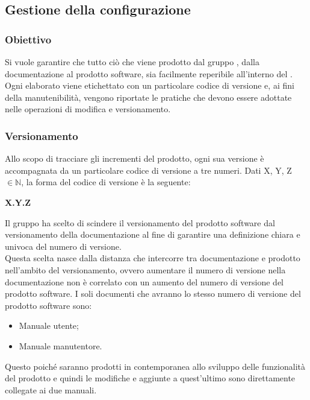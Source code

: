\subsection{Gestione della configurazione}
\subsubsection{Obiettivo}
Si vuole garantire che tutto ciò che viene prodotto dal gruppo \Gruppo{}, dalla documentazione al prodotto software, sia facilmente reperibile all’interno del .
Ogni elaborato viene etichettato con un particolare codice di versione e, ai fini della manutenibilità, vengono riportate le pratiche che devono essere adottate nelle operazioni di modifica e versionamento.

\subsubsection{Versionamento}
Allo scopo di tracciare gli incrementi del prodotto, ogni sua versione è accompagnata da un particolare codice di versione a tre numeri. Dati X, Y, Z $\in \mathbb{N}$, la forma del codice di versione è la seguente:
\begin{center}
	\textbf{X.Y.Z}
\end{center}
Il gruppo ha scelto di scindere il versionamento del prodotto software dal versionamento della documentazione al fine di garantire una definizione chiara e univoca del numero di versione.\\
Questa scelta nasce dalla distanza che intercorre tra documentazione e prodotto nell'ambito del versionamento, ovvero aumentare il numero di versione nella documentazione non è correlato con un aumento del numero di versione del prodotto software.
I soli documenti che avranno lo stesso numero di versione del prodotto software sono: 
\begin{itemize}
	\item Manuale utente;
	\item Manuale manutentore.
\end{itemize}  
Questo poiché saranno prodotti in contemporanea allo sviluppo delle funzionalità del prodotto e quindi le modifiche e aggiunte a quest'ultimo sono direttamente collegate ai due manuali.\\

